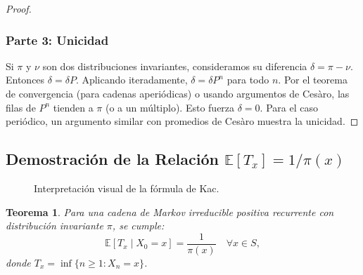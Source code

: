 \documentclass[11pt,a4paper]{article}
\theoremstyle{plain}
\newtheorem{teorema}{Teorema}[section]
\theoremstyle{definition}
\theoremstyle{remark}
\newcommand{\E}{\mathbb{E}}
\newcommand{\1}{\mathds{1}}
\begin{document}
\begin{proof}
\subsubsection*{Parte 3: Unicidad}
Si \(\pi\) y \(\nu\) son dos distribuciones invariantes, consideramos su diferencia \(\delta = \pi - \nu\). Entonces \(\delta = \delta P\). Aplicando iteradamente, \(\delta = \delta P^n\) para todo \(n\). Por el teorema de convergencia (para cadenas aperiódicas) o usando argumentos de Cesàro, las filas de \(P^n\) tienden a \(\pi\) (o a un múltiplo). Esto fuerza \(\delta = 0\). Para el caso periódico, un argumento similar con promedios de Cesàro muestra la unicidad.
\end{proof}



\subsection{Demostración de la Relación \(\mathbb{E}[T_x] = 1/\pi(x)\)}


\begin{figure}[h!]
\centering
{}
\caption{Interpretación visual de la fórmula de Kac.}
\end{figure}



\begin{teorema}
Para una cadena de Markov irreducible positiva recurrente con distribución invariante \(\pi\), se cumple:
\[
\mathbb{E}[T_x \mid X_0 = x] = \frac{1}{\pi(x)} \quad \forall x \in S,
\]
donde \(T_x = \inf\{n \geq 1: X_n = x\}\).
\end{teorema}
\end{document}
